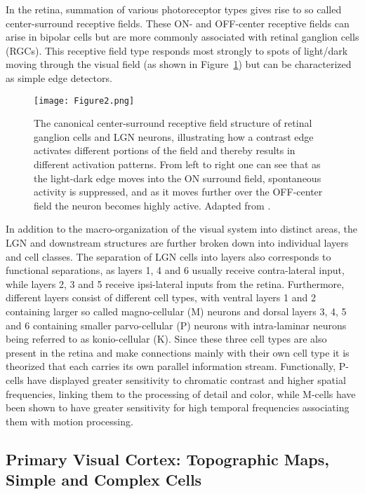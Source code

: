 In the retina, summation of various photoreceptor types gives rise to
so called center-surround receptive fields. These ON- and OFF-center
receptive fields can arise in bipolar cells but are more commonly
associated with retinal ganglion cells (RGCs). This receptive field
type responds most strongly to spots of light/dark moving through the
visual field (as shown in Figure~\ref{Center-Surround}) but can be
characterized as simple edge detectors.

\begin{figure}
	\centering \texttt{[image: Figure2.png]}
	\caption[A Center-surround receptive field. Adapted from
      \cite{Bear2006}.]{The canonical center-surround receptive field
      structure of retinal ganglion cells and LGN neurons,
      illustrating how a contrast edge activates different portions of
      the field and thereby results in different activation
      patterns. From left to right one can see that as the light-dark
      edge moves into the ON surround field, spontaneous activity is
      suppressed, and as it moves further over the OFF-center field
      the neuron becomes highly active. Adapted from \cite{Bear2006}.}
	\label{Center-Surround}
\end{figure}

In addition to the macro-organization of the visual system into
distinct areas, the LGN and downstream structures are further
broken down into individual layers and cell classes. The separation of
LGN cells into layers also corresponds to functional separations, as
layers 1, 4 and 6 usually receive contra-lateral input, while layers
2, 3 and 5 receive ipsi-lateral inputs from the retina. Furthermore,
different layers consist of different cell types, with ventral layers
1 and 2 containing larger so called magno-cellular (M) neurons and
dorsal layers 3, 4, 5 and 6 containing smaller parvo-cellular (P)
neurons with intra-laminar neurons being referred to as konio-cellular
(K). Since these three cell types are also present in the retina and
make connections mainly with their own cell type it is theorized that
each carries its own parallel information stream. Functionally,
P-cells have displayed greater sensitivity to chromatic contrast and
higher spatial frequencies, linking them to the processing of detail
and color, while M-cells have been shown to have greater sensitivity
for high temporal frequencies associating them with motion processing.

\subsection{Primary Visual Cortex: Topographic Maps, Simple and Complex Cells}

